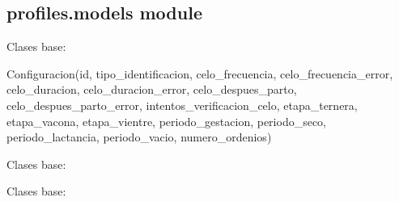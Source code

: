 \documentclass[letterpaper,10pt,spanish]{sphinxmanual}
\begin{document}
\subsection{profiles.models module}
\label{profiles:profiles-models-module}\label{profiles:module-profiles.models}

\begin{fulllineitems}
\label{profiles:profiles.models.Configuracion}
Clases base: 

Configuracion(id, tipo\_identificacion, celo\_frecuencia, celo\_frecuencia\_error, celo\_duracion, celo\_duracion\_error, celo\_despues\_parto, celo\_despues\_parto\_error, intentos\_verificacion\_celo, etapa\_ternera, etapa\_vacona, etapa\_vientre, periodo\_gestacion, periodo\_seco, periodo\_lactancia, periodo\_vacio, numero\_ordenios)

\begin{fulllineitems}
\label{profiles:profiles.models.Configuracion.DoesNotExist}
Clases base: 

\end{fulllineitems}


\begin{fulllineitems}
\label{profiles:profiles.models.Configuracion.IDENTIFICACION_CHOICES}
\end{fulllineitems}


\begin{fulllineitems}
\label{profiles:profiles.models.Configuracion.MultipleObjectsReturned}
Clases base: 

\end{fulllineitems}



\end{fulllineitems}
\end{document}
